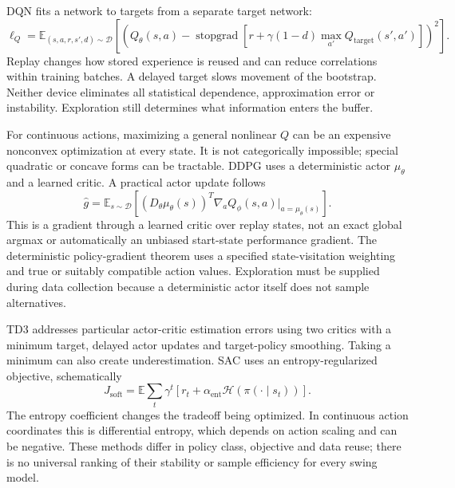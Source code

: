 DQN fits a network to targets from a separate target network:
\begin{equation}
\ell_Q=\mathbb E_{(s,a,r,s',d)\sim\mathcal D}
\left[\left(Q_\theta(s,a)-
\operatorname{stopgrad}[r+\gamma(1-d)\max_{a'}Q_{\mathrm{target}}(s',a')]\right)^2\right].
\label{eq:dqn_loss}
\end{equation}
Replay changes how stored experience is reused and can reduce correlations within training batches. A delayed target slows movement of the bootstrap. Neither device eliminates all statistical dependence, approximation error or instability. Exploration still determines what information enters the buffer.

For continuous actions, maximizing a general nonlinear $Q$ can be an expensive nonconvex optimization at every state. It is not categorically impossible; special quadratic or concave forms can be tractable. DDPG uses a deterministic actor $\mu_\theta$ and a learned critic. A practical actor update follows
\begin{equation}
\hat g=\mathbb E_{s\sim\mathcal D}
\left[(D_\theta\mu_\theta(s))^T
\nabla_aQ_\phi(s,a)\big|_{a=\mu_\theta(s)}\right].
\label{eq:ddpg_gradient}
\end{equation}
This is a gradient through a learned critic over replay states, not an exact global argmax or automatically an unbiased start-state performance gradient. The deterministic policy-gradient theorem uses a specified state-visitation weighting and true or suitably compatible action values. Exploration must be supplied during data collection because a deterministic actor itself does not sample alternatives.

TD3 addresses particular actor-critic estimation errors using two critics with a minimum target, delayed actor updates and target-policy smoothing. Taking a minimum can also create underestimation. SAC uses an entropy-regularized objective, schematically
\begin{equation}
J_{\mathrm{soft}}=\mathbb E\sum_t\gamma^t
\left[r_t+\alpha_{\mathrm{ent}}\mathcal H(\pi(\cdot\mid s_t))\right].
\label{eq:sac_objective}
\end{equation}
The entropy coefficient changes the tradeoff being optimized. In continuous action coordinates this is differential entropy, which depends on action scaling and can be negative. These methods differ in policy class, objective and data reuse; there is no universal ranking of their stability or sample efficiency for every swing model.

